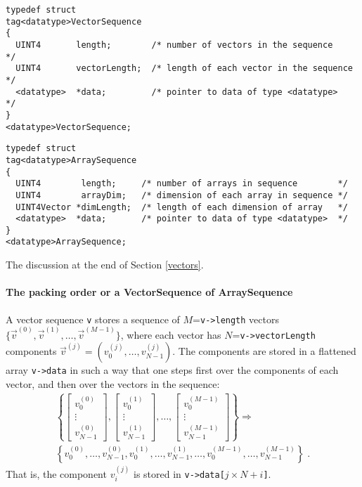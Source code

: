 \documentclass[]{ligodcc}
\begin{document}
{\footnotesize
\begin{verbatim}
typedef struct
tag<datatype>VectorSequence
{
  UINT4       length;        /* number of vectors in the sequence     */
  UINT4       vectorLength;  /* length of each vector in the sequence */
  <datatype>  *data;         /* pointer to data of type <datatype>    */
}
<datatype>VectorSequence;
\end{verbatim}}


{\footnotesize
\begin{verbatim}
typedef struct
tag<datatype>ArraySequence
{
  UINT4        length;     /* number of arrays in sequence        */
  UINT4        arrayDim;   /* dimension of each array in sequence */
  UINT4Vector *dimLength;  /* length of each dimension of array   */
  <datatype>  *data;       /* pointer to data of type <datatype>  */
}
<datatype>ArraySequence;
\end{verbatim}}

\noindent
The discussion at the end of Section \ref{vectors}.

\paragraph{The packing order or a VectorSequence of ArraySequence \\}
\label{packingorderAS} 

\noindent A vector sequence {\tt v} stores a sequence of
$M$={\tt v->length} vectors
$\{\vec{v}^{(0)},\vec{v}^{(1)},\ldots,\vec{v}^{(M-1)}\}$, where each
vector has $N$={\tt v->vectorLength} components
$\vec{v}^{(j)}=(v^{(j)}_0,\ldots,v^{(j)}_{N-1})$.  The components are
stored in a flattened array {\tt v->data} in such a way that one
steps first over the components of each vector, and then over the
vectors in the sequence:
\begin{eqnarray}
\left\{
\left[\begin{array}{c} v^{(0)}_0 \\ \vdots \\ v^{(0)}_{N-1} \end{array}\right],
\left[\begin{array}{c} v^{(1)}_0 \\ \vdots \\ v^{(1)}_{N-1} \end{array}\right],
\ldots ,
\left[\begin{array}{c}
v^{(M-1)}_0 \\ \vdots \\ v^{(M-1)}_{N-1} \end{array}\right]
\right\} \Longrightarrow \nonumber\\
\left\{ v^{(0)}_0, \ldots, v^{(0)}_{N-1}, v^{(1)}_0, \ldots, v^{(1)}_{N-1},
\ldots, v^{(M-1)}_0, \ldots, v^{(M-1)}_{N-1} \right\} \; .
\end{eqnarray}
That is, the component $v^{(j)}_i$ is stored in
{\tt v->data[}$j\times N+i${\tt ]}.
   
\end{document}
